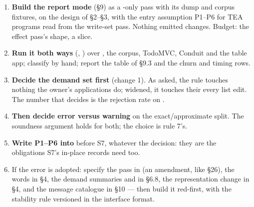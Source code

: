 

\begin{enumerate}
\item \textbf{Build the report mode} (§9) as a -only pass with its dump and corpus fixtures, on the design of §2–§3, with the entry assumption P1–P6 for TEA programs read from the write-set pass. Nothing emitted changes. Budget: the effect pass's shape, a slice.
\item \textbf{Run it both ways} (, ) over , the corpus, TodoMVC, Conduit and the table app; classify by hand; report the table of §9.3 and the churn and timing rows.
\item \textbf{Decide the demand set first} (change 1). As asked, the rule touches nothing the owner's applications do; widened, it touches their every list edit. The number that decides is the rejection rate on .
\item \textbf{Then decide error versus warning} on the exact/approximate split. The soundness argument holds for both; the choice is rule 7's.
\item \textbf{Write P1–P6 into } before S7, whatever the decision: they are the obligations S7's in-place records need too.
\item If the error is adopted: specify the pass in  (an amendment, like §26), the  words in  §4, the demand summaries and  in  §6.8, the representation change in  §4, and the message catalogue in  §10 — then build it red-first, with the stability rule versioned in the interface format.
\end{enumerate}


